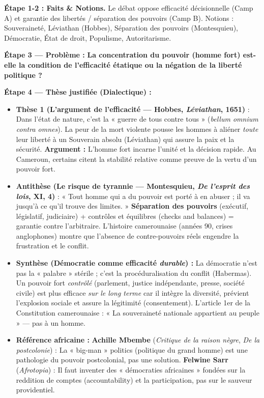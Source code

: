 \documentclass[11pt]{article}
\newcommand{\cle}[1]{{\popxbold\color{popdark}#1}}
\begin{document}
\begin{exoresolu}
\textbf{Étape 1-2 : Faits \& Notions.} Le débat oppose \cle{efficacité décisionnelle} (Camp A) et \cle{garantie des libertés / séparation des pouvoirs} (Camp B). Notions : \cle{Souveraineté}, \cle{Léviathan} (Hobbes), \cle{Séparation des pouvoirs} (Montesquieu), \cle{Démocratie}, \cle{État de droit}, \cle{Populisme}, \cle{Autoritarisme}.

\textbf{Étape 3 — Problème :} \textbf{La concentration du pouvoir (homme fort) est-elle la condition de l'efficacité étatique ou la négation de la liberté politique ?}

\textbf{Étape 4 — Thèse justifiée (Dialectique) :}
\begin{itemize}
    \item \textbf{Thèse 1 (L'argument de l'efficacité — Hobbes, \emph{Léviathan}, 1651)} : Dans l'état de nature, c'est la « guerre de tous contre tous » (\emph{bellum omnium contra omnes}). La peur de la mort violente pousse les hommes à aliéner \emph{toute} leur liberté à un \cle{Souverain absolu} (Léviathan) qui assure la paix et la sécurité. \textbf{Argument :} L'homme fort incarne l'unité et la décision rapide. Au Cameroun, certains citent la stabilité relative comme preuve de la vertu d'un pouvoir fort.
    \item \textbf{Antithèse (Le risque de tyrannie — Montesquieu, \emph{De l'esprit des lois}, XI, 4)} : « Tout homme qui a du pouvoir est porté à en abuser ; il va jusqu'à ce qu'il trouve des limites. » \textbf{Séparation des pouvoirs} (exécutif, législatif, judiciaire) + \cle{contrôles et équilibres} (checks and balances) = garantie contre l'arbitraire. L'histoire camerounaise (années 90, crises anglophones) montre que l'absence de contre-pouvoirs réels engendre la frustration et le conflit.
    \item \textbf{Synthèse (Démocratie comme efficacité \emph{durable}) :} La démocratie n'est pas la « palabre » stérile ; c'est la \cle{procéduralisation du conflit} (Habermas). Un pouvoir fort \emph{contrôlé} (parlement, justice indépendante, presse, société civile) est plus efficace \emph{sur le long terme} car il intègre la diversité, prévient l'explosion sociale et assure la \cle{légitimité} (consentement). L'article 1er de la Constitution camerounaise : « La souveraineté nationale appartient au peuple » — pas à un homme.
    \item \textbf{Référence africaine :} \textbf{Achille Mbembe} (\emph{Critique de la raison nègre}, \emph{De la postcolonie}) : La « big-man » politics (politique du grand homme) est une pathologie du pouvoir postcolonial, pas une solution. \textbf{Felwine Sarr} (\emph{Afrotopia}) : Il faut inventer des « démocraties africaines » fondées sur la \cle{reddition de comptes} (accountability) et la \cle{participation}, pas sur le sauveur providentiel.
\end{itemize}
\end{exoresolu}
\end{document}
